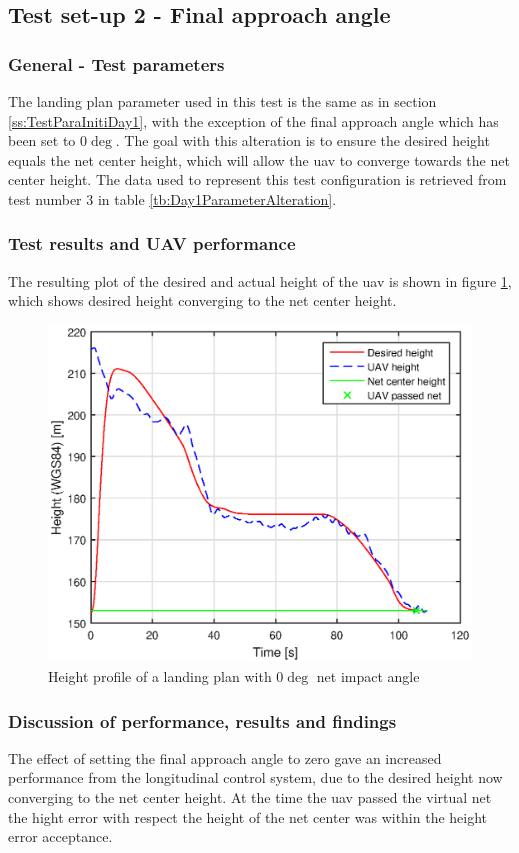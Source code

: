 \subsection{Test set-up 2 - Final approach angle}\label{ss:Day1FinalApp}
\subsubsection{General - Test parameters}
The landing plan parameter used in this test is the same as in section \ref{ss:TestParaInitiDay1}, with the exception of the final approach angle which has been set to $0 \deg$. The goal with this alteration is to ensure the desired height equals the net center height, which will allow the \gls{uav} to converge towards the net center height. The data used to represent this test configuration is retrieved from test number $3$ in table \ref{tb:Day1ParameterAlteration}.
\subsubsection{Test results and UAV performance}
The resulting plot of the desired and actual height of the \gls{uav} is shown in figure \ref{Fig:Height31mai31mai105034}, which shows desired height converging to the net center height.
\begin{figure}[H]
\centering
		\includegraphics[scale=0.7]{figs/Experiment/Height31mai105034.eps}
		\caption{Height profile of a landing plan with $0 \deg$ net impact angle}
		\label{Fig:Height31mai31mai105034}
\end{figure}
\subsubsection{Discussion of performance, results and findings}
The effect of setting the final approach angle to zero gave an increased performance from the longitudinal control system, due to the desired height now converging to the net center height. At the time the \gls{uav} passed the virtual net the hight error with respect the height of the net center was within the height error acceptance.
